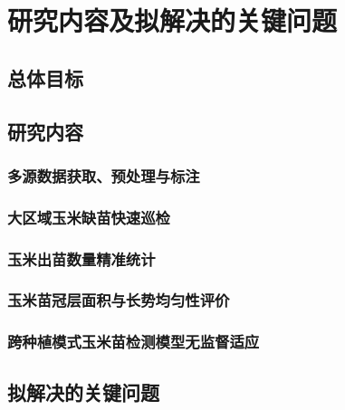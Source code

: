 \chapter{研究内容及拟解决的关键问题}

\section{总体目标}

\section{研究内容}

\subsection{多源数据获取、预处理与标注}

\subsection{大区域玉米缺苗快速巡检}

\subsection{玉米出苗数量精准统计}

\subsection{玉米苗冠层面积与长势均匀性评价}

\subsection{跨种植模式玉米苗检测模型无监督适应}

\section{拟解决的关键问题}
